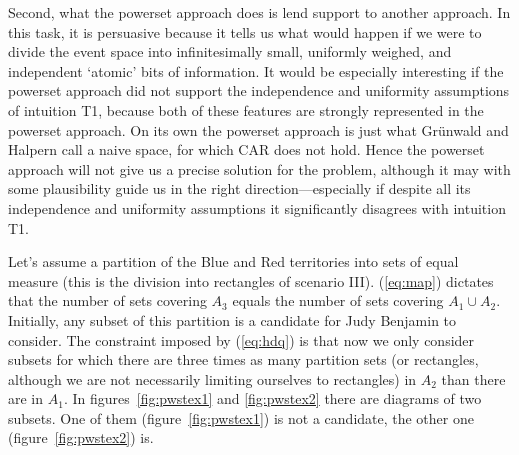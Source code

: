 \documentclass[smallextended]{svjour3}       %
\newcommand{\qnull}[1]{`#1'}
\begin{document}
Second, what the powerset approach does is lend support to another
approach. In this task, it is persuasive because it tells us what
would happen if we were to divide the event space into infinitesimally
small, uniformly weighed, and independent \qnull{atomic} bits of
information. It would be especially interesting if the powerset
approach did not support the independence and uniformity assumptions
of intuition T1, because both of these features are strongly
represented in the powerset approach. On its own the powerset approach
is just what Gr{\"u}nwald and Halpern call a naive space, for which
CAR does not hold. Hence the powerset approach will not give us a
precise solution for the problem, although it may with some
plausibility guide us in the right direction---especially if despite
all its independence and uniformity assumptions it significantly
disagrees with intuition T1.


Let's assume a partition of the Blue and Red territories into sets of
equal measure (this is the division into rectangles of scenario III).
({\ref{eq:map}}) dictates that the number of sets covering $A_{3}$
equals the number of sets covering $A_{1}\cup{}A_{2}$. Initially, any
subset of this partition is a candidate for Judy Benjamin to consider.
The constraint imposed by ({\ref{eq:hdq}}) is that now we only
consider subsets for which there are three times as many partition
sets (or rectangles, although we are not necessarily limiting
ourselves to rectangles) in $A_{2}$ than there are in $A_{1}$. In
figures~\ref{fig:pwstex1} and \ref{fig:pwstex2} there are diagrams of
two subsets. One of them (figure~\ref{fig:pwstex1}) is not a
candidate, the other one (figure~\ref{fig:pwstex2}) is.
\end{document}
